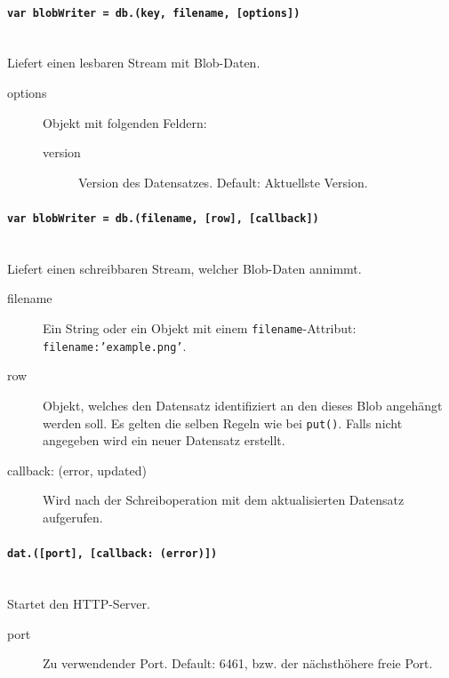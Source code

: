 
\paragraph{\texttt{var blobWriter = db.(key, filename, [options])}} ~\\
Liefert einen lesbaren Stream mit Blob-Daten.

\begin{description}
\item[options] Objekt mit folgenden Feldern:
    \begin{description}
    \item[version] Version des Datensatzes. Default: Aktuellste Version.
    \end{description}
\end{description}


\paragraph{\texttt{var blobWriter = db.(filename, [row], [callback])}} ~\\
Liefert einen schreibbaren Stream, welcher Blob-Daten annimmt.

\begin{description}
\item[filename] Ein String oder ein Objekt mit einem \texttt{filename}-Attribut: \texttt{{filename:'example.png'}}.
\item[row] Objekt, welches den Datensatz identifiziert an den dieses Blob angehängt werden soll. Es gelten die selben Regeln wie bei \texttt{put()}. Falls nicht angegeben wird ein neuer Datensatz erstellt.
\item[callback: (error, updated)] Wird nach der Schreiboperation mit dem aktualisierten Datensatz aufgerufen.
\end{description}


\paragraph{\texttt{dat.([port], [callback: (error)])}} ~\\
Startet den HTTP-Server.

\begin{description}
\item[port] Zu verwendender Port. Default: 6461, bzw. der nächsthöhere freie Port.
\end{description}

